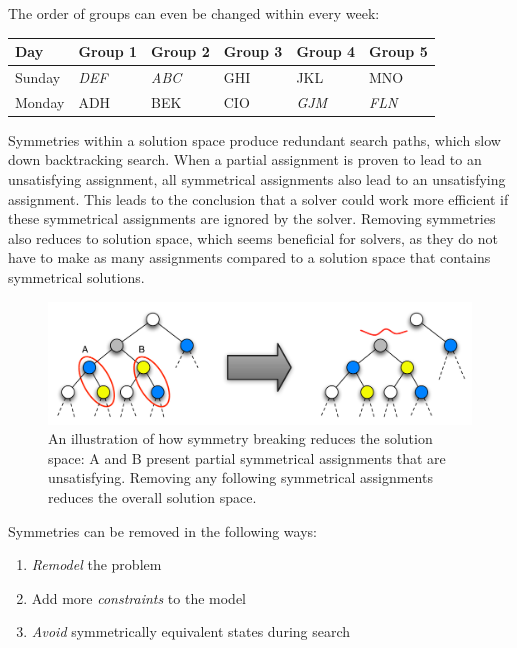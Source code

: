 \documentclass[a4paper]{scrartcl}
\begin{document}
The order of groups can even be changed within every week:

\begin{table}[h]
\centering
\begin{tabular}{ l | l  l  l l  l }
Day & Group 1 & Group 2 & Group 3 & Group 4 & Group 5 \\
\hline
Sunday & \emph{DEF} & \emph{ABC} & GHI & JKL & MNO \\
Monday & ADH  & BEK & CIO & \emph{GJM} & \emph{FLN}\\
\end{tabular}
\end{table}

Symmetries within a solution space produce redundant search paths, which slow down backtracking search. When a partial assignment is proven to lead to an unsatisfying assignment, all symmetrical assignments also lead to an unsatisfying assignment. This leads to the conclusion that a solver could work more efficient if these symmetrical assignments are ignored by the solver. Removing symmetries also reduces to solution space, which seems beneficial for solvers, as they do not have to make as many assignments compared to a solution space that contains symmetrical solutions.

\begin{figure}[h!]
\centering
    \includegraphics[width=13.6cm]{images/symmetry_breaking}
    \caption{An illustration of how symmetry breaking reduces the solution space: A and B present partial symmetrical assignments that are unsatisfying. Removing any following symmetrical assignments reduces the overall solution space.}
\end{figure}

Symmetries can be removed in the following ways:

\begin{mdframed}[skipabove=\baselineskip, skipbelow=\baselineskip, leftmargin=20, rightmargin=20]

\begin{enumerate}
\item \emph{Remodel} the problem
\item Add more \emph{constraints} to the model
\item \emph{Avoid} symmetrically equivalent states during search
\end{enumerate}

\end{mdframed}
\end{document}
